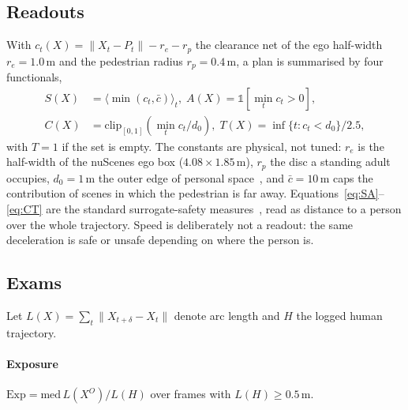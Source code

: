 \subsection{Readouts}
With $c_t(X)=\|X_t-P_t\|-r_e-r_p$ the clearance net of the ego half-width $r_e=1.0$\,m and the
pedestrian radius $r_p=0.4$\,m, a plan is summarised by four functionals,
\begin{align}
S(X)&=\langle\min(c_t,\bar c)\rangle_t,\; A(X)=\mathbb{1}[\min_t c_t>0],\label{eq:SA}\\
C(X)&=\mathrm{clip}_{[0,1]}(\min_t c_t/d_0),\; T(X)=\inf\{t\!:c_t<d_0\}/2.5,\label{eq:CT}
\end{align}
with $T=1$ if the set is empty. The constants are physical, not tuned: $r_e$ is the half-width of the
nuScenes ego box ($4.08\times1.85$\,m), $r_p$ the disc a standing adult occupies, $d_0=1$\,m the outer
edge of personal space~\cite{hall1966hidden}, and $\bar c=10$\,m caps the contribution of scenes in
which the pedestrian is far away. Equations~\eqref{eq:SA}--\eqref{eq:CT} are the standard surrogate-safety measures~\cite{gettman2003surrogate}, read as distance to a person over the whole trajectory. Speed is deliberately not a readout: the same deceleration is safe or unsafe depending on where the person is.

\subsection{Exams}
Let $L(X)=\sum_t\|X_{t+\delta}-X_t\|$ denote arc length and $H$ the logged human trajectory.

\paragraph{Exposure}
$\mathrm{Exp}=\mathrm{med}\,L(X^{O})/L(H)$ over frames with $L(H)\ge0.5$\,m.

